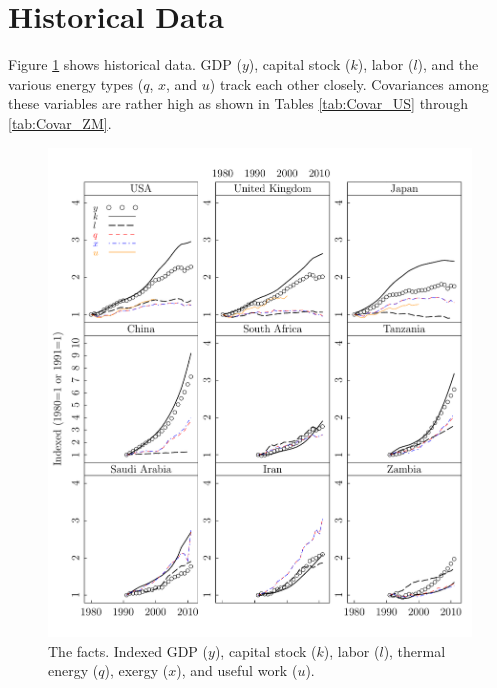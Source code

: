 \documentclass[preprint,authoryear,12pt]{elsarticle}\usepackage{graphicx, color}
\makeatletter
\def\maxwidth{ %
  \ifdim\Gin@nat@width>\linewidth
    \linewidth
  \else
    \Gin@nat@width
  \fi
}
\newenvironment{knitrout}{}{} %
\makeatother
\begin{document}
\section{Historical Data}

Figure \ref{fig:Factors_Lattice_Graph} shows historical data. GDP ($y$), capital stock ($k$), labor ($l$), and the various energy types ($q$, $x$, and $u$) track each other closely. Covariances among these variables are rather high as shown in Tables \ref{tab:Covar_US} through \ref{tab:Covar_ZM}.

\begin{knitrout}
\color{fgcolor}\begin{figure}[H]

\includegraphics[width=\maxwidth]{figure/Factors_Lattice_Graph} \caption[The facts]{The facts. Indexed GDP ($y$), capital stock ($k$), labor ($l$), thermal energy ($q$), exergy ($x$), and useful work ($u$).\label{fig:Factors_Lattice_Graph}}
\end{figure}


\end{knitrout}
\end{document}
